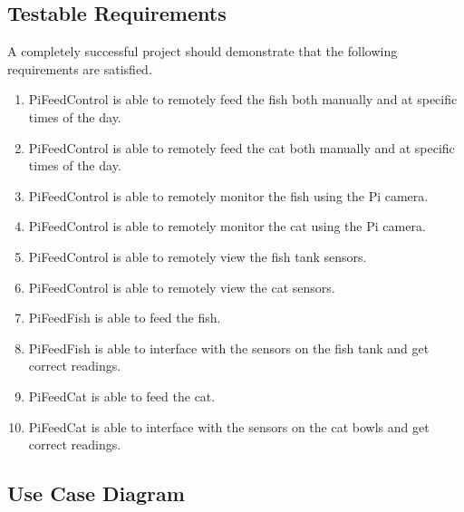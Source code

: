 \subsection{Testable Requirements}
A completely successful project should demonstrate that the following requirements
are satisfied.
\begin{enumerate}
    \item PiFeedControl is able to remotely feed the fish both manually and at
          specific times of the day.
    \item PiFeedControl is able to remotely feed the cat both manually and at
          specific times of the day.
    \item PiFeedControl is able to remotely monitor the fish using the Pi camera.
    \item PiFeedControl is able to remotely monitor the cat using the Pi camera.
    \item PiFeedControl is able to remotely view the fish tank sensors.
    \item PiFeedControl is able to remotely view the cat sensors.
    \item PiFeedFish is able to feed the fish.
    \item PiFeedFish is able to interface with the sensors on the fish tank and
          get correct readings.
    \item PiFeedCat is able to feed the cat.
    \item PiFeedCat is able to interface with the sensors on the cat bowls and
          get correct readings.
\end{enumerate}

\subsection{Use Case Diagram}

